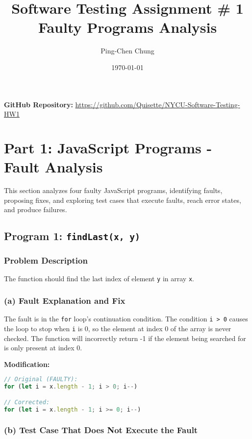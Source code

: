 \documentclass[11pt,a4paper]{article}
\title{\textbf{Software Testing Assignment \# 1}\\ Faulty Programs Analysis}
\author{Ping-Chen Chung}
\date{\today}
\begin{document}
\maketitle

\noindent

\textbf{GitHub Repository:} \url{https://github.com/Quisette/NYCU-Software-Testing-HW1}

\tableofcontents
\newpage

\section{Part 1: JavaScript Programs - Fault Analysis}

This section analyzes four faulty JavaScript programs, identifying faults, proposing fixes, and exploring test cases that execute faults, reach error states, and produce failures.

\subsection{Program 1: \texttt{findLast(x, y)}}

\subsubsection{Problem Description}
The function should find the last index of element \texttt{y} in array \texttt{x}.

\subsubsection{(a) Fault Explanation and Fix}

 The fault is in the \texttt{for} loop's continuation condition. The condition \texttt{i > 0} causes the loop to stop when \texttt{i} is 0, so the element at index 0 of the array is never checked. The function will incorrectly return -1 if the element being searched for is only present at index 0.

\textbf{Modification:}
\begin{lstlisting}[language=JavaScript]
// Original (FAULTY):
for (let i = x.length - 1; i > 0; i--)

// Corrected:
for (let i = x.length - 1; i >= 0; i--)
\end{lstlisting}

\subsubsection{(b) Test Case That Does Not Execute the Fault}
\end{document}
